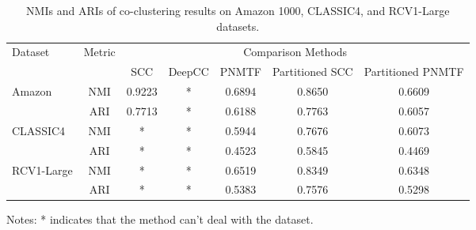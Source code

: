 \begin{table}[htbp]
    \centering
    \caption{NMIs and ARIs of co-clustering results on Amazon 1000, CLASSIC4, and RCV1-Large datasets.}
    \begin{tabular}{@{} l c ccccc @{}}
        \toprule
        \multirow{2}{*}{Dataset}    & \multirow{2}{*}{Metric} & \multicolumn{5}{c}{Comparison Methods}                                                         \\
        \cmidrule{3-7}
                                    &                         & SCC                                    & DeepCC & PNMTF  & Partitioned SCC & Partitioned PNMTF \\
        \midrule
        \multirow{2}{*}{Amazon}     & NMI                     & 0.9223                                 & *      & 0.6894 & 0.8650          & 0.6609            \\
                                    & ARI                     & 0.7713                                 & *      & 0.6188 & 0.7763          & 0.6057            \\
        \multirow{2}{*}{CLASSIC4}   & NMI                     & *                                      & *      & 0.5944 & 0.7676          & 0.6073            \\
                                    & ARI                     & *                                      & *      & 0.4523 & 0.5845          & 0.4469            \\
        \multirow{2}{*}{RCV1-Large} & NMI                     & *                                      & *      & 0.6519 & 0.8349          & 0.6348            \\
                                    & ARI                     & *                                      & *      & 0.5383 & 0.7576          & 0.5298            \\
        \bottomrule
    \end{tabular}
    \begin{tablenotes}
        \small
        \item Notes: * indicates that the method can't deal with the dataset.
    \end{tablenotes}
\end{table}